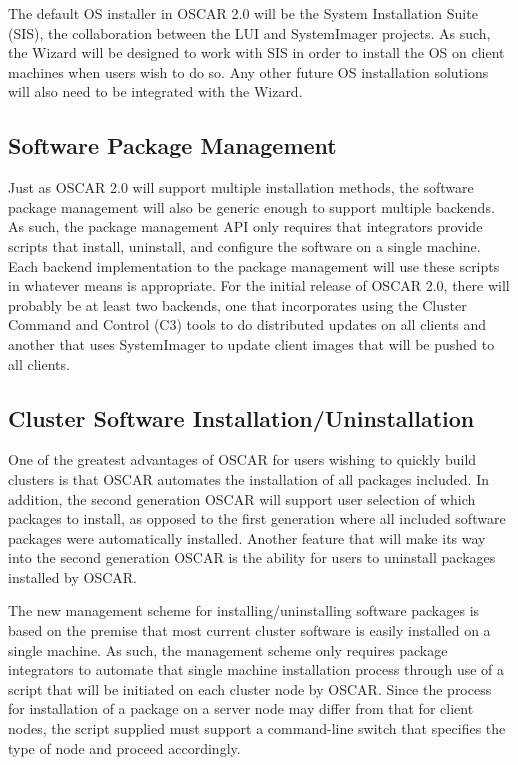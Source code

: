 The default OS installer in OSCAR 2.0 will be the System Installation
Suite (SIS), the collaboration between the LUI and SystemImager
projects. As such, the Wizard will be designed to work with SIS in
order to install the OS on client machines when users wish to do
so. Any other future OS installation solutions will also need to be
integrated with the Wizard.

\subsection{Software Package Management}
\label{sec:design-software-package-mgmt}

Just as OSCAR 2.0 will support multiple installation methods, the
software package management will also be generic enough to support
multiple backends. As such, the package management API only requires
that integrators provide scripts that install, uninstall, and
configure the software on a single machine. Each backend
implementation to the package management will use these scripts in
whatever means is appropriate. For the initial release of OSCAR 2.0,
there will probably be at least two backends, one that incorporates
using the Cluster Command and Control (C3) tools to do distributed
updates on all clients and another that uses SystemImager to update
client images that will be pushed to all clients.

\subsection{Cluster Software Installation/Uninstallation}

One of the greatest advantages of OSCAR for users wishing to quickly
build clusters is that OSCAR automates the installation of all
packages included. In addition, the second generation OSCAR will
support user selection of which packages to install, as opposed to the
first generation where all included software packages were
automatically installed. Another feature that will make its way into
the second generation OSCAR is the ability for users to uninstall
packages installed by OSCAR.

The new management scheme for installing/uninstalling software
packages is based on the premise that most current cluster software is
easily installed on a single machine. As such, the management scheme
only requires package integrators to automate that single machine
installation process through use of a script that will be initiated on
each cluster node by OSCAR. Since the process for installation of a
package on a server node may differ from that for client nodes, the
script supplied must support a command-line switch that specifies the
type of node and proceed accordingly.

